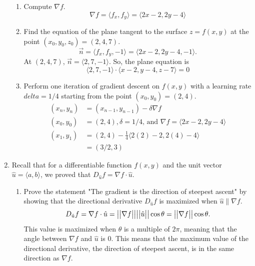 \begin{enumerate}
\begin{enumerate}[label=\alph*.]
		\item Compute $\nabla f$.
		\begin{equation*}
			\nabla f = \langle f_x, f_y\rangle = \langle 2x-2, 2y-4 \rangle
		\end{equation*}
		
		\item Find the equation of the plane tangent to the surface $z = f(x,y)$ at the point $(x_0, y_0, z_0) = (2,4,7)$.
		\begin{equation*}
			\vec{n} = \langle f_x, f_y, -1\rangle = \langle 2x-2, 2y-4, -1 \rangle.
		\end{equation*}
		At $(2,4,7)$, $\vec{n} = \langle 2, 7, -1 \rangle$. So, the plane equation is 
		\begin{equation*}
			\langle 2, 7, -1 \rangle \cdot \langle x-2, y-4, z-7 \rangle = 0
		\end{equation*}
		
		\item Perform one iteration of gradient descent on $f(x,y)$ with a learning rate $delta = 1/4$ starting from the point $(x_0,y_0) = (2,4)$.\\
		\begin{align*}
			(x_n, y_n) &= (x_{n-1},y_{n-1}) - \delta\nabla f \\
			(x_0, y_0) &= (2,4), \delta = 1/4 \text{, and } \nabla f = \langle 	2x-2, 2y-4 \rangle \\
			(x_1, y_1) &= (2,4) - \frac{1}{4} \langle 2(2)-2, 2(4)-4 \rangle \\
			&= (3/2, 3)
		\end{align*}
	\end{enumerate}

	\item Recall that for a differentiable function $f(x,y)$ and the unit vector $\hat{u} = \langle a, b \rangle$, we proved that $D_{\hat{u}}f = \nabla f \cdot \hat{u}$.
	\begin{enumerate}[label=\alph*.]
		\item Prove the statement "The gradient is the direction of steepest ascent" by showing that the directional derivative $D_{\hat{u}}f$ is maximized when $\hat{u}\parallel\nabla f$.
		\begin{equation*}
			D_{\hat{u}}f = \nabla f \cdot \hat{u}=\big\lvert \big\lvert \nabla f \big\rvert \big\rvert\big\lvert \big\lvert \hat{u} \big\rvert \big\rvert\cos{\theta} = \big\lvert \big\lvert \nabla f \big\rvert \big\rvert\cos{\theta}.
		\end{equation*}
		This value is maximized when $\theta$ is a multiple of $2\pi$, meaning that the angle between $\nabla f$ and $\hat{u}$ is 0. This means that the maximum value of the directional derivative, the direction of steepest ascent, is in the same direction as $\nabla f$.\\
			

\end{enumerate}
\end{enumerate}
